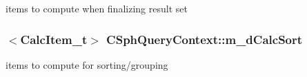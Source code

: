 items to compute when finalizing result set 

\hypertarget{classCSphQueryContext_a3e7861fc7ec930997c5b3f0c2fc57a8d}{
\subsubsection[{m\-\_\-d\-Calc\-Sort}]{$<${\bf Calc\-Item\-\_\-t}$>$ C\-Sph\-Query\-Context\-::m\-\_\-d\-Calc\-Sort}}\label{classCSphQueryContext_a3e7861fc7ec930997c5b3f0c2fc57a8d}


items to compute for sorting/grouping 

